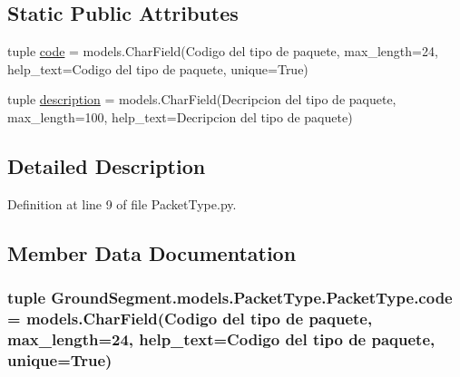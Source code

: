 \subsection*{Static Public Attributes}
\begin{DoxyCompactItemize}
\item 
tuple \hyperlink{class_ground_segment_1_1models_1_1_packet_type_1_1_packet_type_a0ee5b3b7eddfef29426b64c45c031d3f}{code} = models.\+Char\+Field(\textquotesingle{}Codigo del tipo de paquete\textquotesingle{}, max\+\_\+length=24, help\+\_\+text=\textquotesingle{}Codigo del tipo de paquete\textquotesingle{}, unique=True)
\item 
tuple \hyperlink{class_ground_segment_1_1models_1_1_packet_type_1_1_packet_type_a0d613a065a218585e621622d3945e206}{description} = models.\+Char\+Field(\textquotesingle{}Decripcion del tipo de paquete\textquotesingle{}, max\+\_\+length=100, help\+\_\+text=\textquotesingle{}Decripcion del tipo de paquete\textquotesingle{})
\end{DoxyCompactItemize}


\subsection{Detailed Description}


Definition at line 9 of file Packet\+Type.\+py.



\subsection{Member Data Documentation}
\hypertarget{class_ground_segment_1_1models_1_1_packet_type_1_1_packet_type_a0ee5b3b7eddfef29426b64c45c031d3f}{}
\subsubsection[{code}]{\setlength{\rightskip}{0pt plus 5cm}tuple Ground\+Segment.\+models.\+Packet\+Type.\+Packet\+Type.\+code = models.\+Char\+Field(\textquotesingle{}Codigo del tipo de paquete\textquotesingle{}, max\+\_\+length=24, help\+\_\+text=\textquotesingle{}Codigo del tipo de paquete\textquotesingle{}, unique=True)\hspace{0.3cm}{\ttfamily [static]}}\label{class_ground_segment_1_1models_1_1_packet_type_1_1_packet_type_a0ee5b3b7eddfef29426b64c45c031d3f}


